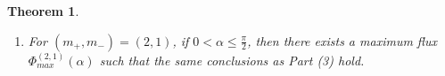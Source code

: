 \documentclass[reqno,12pt]{amsart}
\newtheorem{theorem}{Theorem}[section]
\begin{document}
\begin{theorem}
\begin{enumerate}
\begin{enumerate}[(a)]
    if $\Phi < \Phi_{max}^{(m_+,m_-)} (\alpha) $, then there exists an SS solution of type $(m_+,m_-)$;
        \item 
        if $\Phi> \Phi^{(m_+,m_-)}_{max}(\alpha)$, then there exists no SS solution of type $(m_+,m_-)$.
   \end{enumerate}
   \item  For $(m_+,m_-)=(2,1)$, if $0<\alpha\leq \frac{\pi}{2}$, then there exists a maximum flux $\Phi^{(2,1)}_{max}(\alpha)$ such that the same conclusions as Part (3) hold.
    \end{enumerate}
    \end{theorem}
\end{document}
